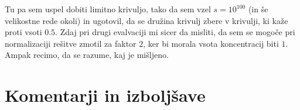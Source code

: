 \documentclass[a4paper]{article}
\begin{document}
Tu pa sem uspel dobiti limitno krivuljo, tako da sem vzel $s = 10^{100}$ (in še velikostne rede okoli) in ugotovil,
da se družina krivulj zbere v krivulji, ki kaže proti vsoti $0.5$. Zdaj pri drugi evalvaciji mi sicer da misliti, da sem
se mogoče pri normalizaciji rešitve zmotil za faktor $2$, ker bi morala vsota koncentracij biti $1$. Ampak recimo, 
da se razume, kaj je mišljeno.\\



\section{Komentarji in izboljšave}

\newpage


\end{document}

